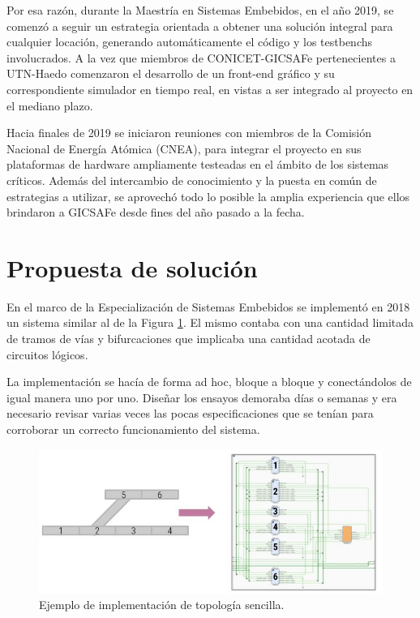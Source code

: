 		Por esa razón, durante la Maestría en Sistemas Embebidos, en el año 2019, se comenzó a seguir un estrategia orientada a obtener una solución integral para cualquier locación, generando automáticamente el código y los testbenchs involucrados. A la vez que miembros de CONICET-GICSAFe pertenecientes a UTN-Haedo comenzaron el desarrollo de un front-end gráfico y su correspondiente simulador en tiempo real, en vistas a ser integrado al proyecto en el mediano plazo.
	
		Hacia finales de 2019 se iniciaron reuniones con miembros de la Comisión Nacional de Energía Atómica (CNEA), para integrar el proyecto en sus plataformas de hardware ampliamente testeadas en el ámbito de los sistemas críticos. Además del intercambio de conocimiento y la puesta en común de estrategias a utilizar, se aprovechó todo lo posible la amplia experiencia que ellos brindaron a GICSAFe desde fines del año pasado a la fecha.
		
	\section{Propuesta de solución}	
		
		En el marco de la Especialización de Sistemas Embebidos se implementó en 2018 un sistema similar al de la Figura \ref{fig:CESE_1}. El mismo contaba con una cantidad limitada de tramos de vías y bifurcaciones que implicaba una cantidad acotada de circuitos lógicos.%
		
		La implementación se hacía de forma ad hoc, bloque a bloque y conectándolos de igual manera uno por uno. Diseñar los ensayos demoraba días o semanas y era necesario revisar varias veces las pocas especificaciones que se tenían para corroborar un correcto funcionamiento del sistema.	
		
		\begin{figure}[htbp!]
			\centering
			\includegraphics[scale=.5]{./Figures/Grafo_VHDL}
			\caption{Ejemplo de implementación de topología sencilla.}
			\label{fig:CESE_1}
		\end{figure}	
		
